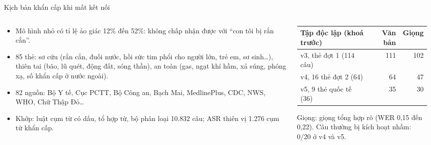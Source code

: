 \documentclass[aspectratio=169,11pt]{beamer}
\begin{document}
\begin{frame}{Kịch bản khẩn cấp khi mất kết nối}
\begin{columns}[T]
\begin{column}{.55\textwidth}
\begin{itemize}
\small
\item Mô hình nhỏ có tỉ lệ ảo giác 12\% đến 52\%: không chấp nhận được với ``con tôi bị rắn cắn''.
\item 85 thẻ: sơ cứu (rắn cắn, đuối nước, hồi sức tim phổi cho người lớn, trẻ em, sơ sinh…), thiên tai (bão, lũ quét, động đất, sóng thần), an toàn (gas, ngạt khí hầm, xả súng, phóng xạ, số khẩn cấp ở nước ngoài).
\item 82 nguồn: Bộ Y tế, Cục PCTT, Bộ Công an, Bạch Mai, MedlinePlus, CDC, NWS, WHO, Chữ Thập Đỏ…
\item Khớp: luật cụm từ có dấu, tổ hợp từ, bộ phân loại 10.832 câu; ASR thiên vị 1.276 cụm từ khẩn cấp.
\end{itemize}
\end{column}
\begin{column}{.42\textwidth}\small
\begin{tabular}{@{}lrr@{}}\toprule
Tập độc lập (khoá trước) & Văn bản & Giọng\\\midrule
v3, thẻ đợt 1 (114 câu) & 111 & 102\\
v4, 16 thẻ đợt 2 (64) & 64 & 47\\
v5, 9 thẻ quốc tế (36) & 35 & 30\\\bottomrule
\end{tabular}\par\vspace{4pt}
{\scriptsize Giọng: giọng tổng hợp rõ (WER 0,15 đến 0,22). Câu thường bị kích hoạt nhầm: 0/20 ở v4 và v5.}
\end{column}
\end{columns}
\end{frame}
\end{document}
